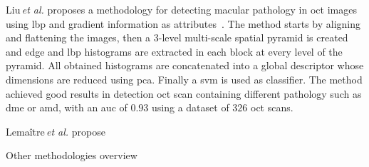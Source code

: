 Liu\,\textit{et al.} proposes a methodology for detecting macular pathology in \ac{oct} images using \ac{lbp} and gradient information as attributes~\cite{Liu2011}.
The method starts by aligning and flattening the images, then a $3$-level multi-scale spatial pyramid is created and edge and \ac{lbp} histograms are extracted in each block at every level of the pyramid.
All obtained histograms are concatenated into a global descriptor whose dimensions are reduced using \ac{pca}. Finally a \ac{svm} is used as classifier.
The method achieved good results in detection \ac{oct} scan containing different pathology such as \ac{dme} or \ac{amd}, with an \ac{auc} of $0.93$ using a dataset of $326$ \ac{oct} scans.

Lema\^itre\,\textit{et al.} propose 

\begin{table}
  \caption{Other methodologies overview}
  \centering
  
  \label{tab:survey}
\end{table}



